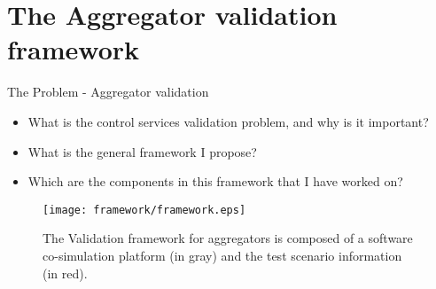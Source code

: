 \chapter{The Aggregator validation framework}
The Problem -  Aggregator validation
\begin{itemize}
	\item What is the control services validation problem, and why is it important?
	\item What is the general framework I propose?
	\item Which are the components in this framework that I have worked on?
\end{itemize}
\begin{figure}[ht]
	\centering
	\caption{The Validation framework for aggregators is composed of a software co-simulation platform (in gray) and the test scenario information (in red). }
	\texttt{[image: framework/framework.eps]}\label{fig:frameworkbig}
\end{figure}

